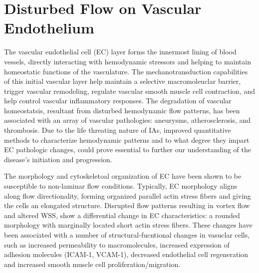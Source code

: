\section{Disturbed Flow on Vascular Endothelium}\label{Chapter1_Section4}

The vascular endothelial cell (EC) layer forms the innermost lining of blood vessels, directly interacting with hemodynamic stressors and helping to maintain homeostatic functions of the vasculature\cite{chien2007mechanotransduction,gimbrone2016endothelial}. The mechanotransduction capabilities of this initial vascular layer help maintain a selective macromoleuclar barrier, trigger vascular remodeling, regulate vascular smooth muscle cell contraction\cite{vanhoutte2009endothelial}, and help control vascular inflammatory responses\cite{chalouhi2012biology}. The degradation of vascular homeostatsis, resultant from disturbed hemodynamic flow patterns, has been associated with an array of vascular pathologies: aneurysms\cite{Cebral119,LONGO2017632}, atherosclerosis\cite{Liu2015}, and thrombosis\cite{chiu2011effects,uzarski2013adaptation}. Due to the life threating nature of IAs, improved quantitative methods to characterize hemodynamic patterns and to what degree they impart EC pathologic changes, could prove essential to further our understanding of the disease's initiation and progression. 

The morphology and cytoskeletoal organization of EC have been shown to be susceptible to non-laminar flow conditions\cite{wang2013endothelial}. Typically, EC morphology aligns along flow directionality, forming organized parallel actin stress fibers and giving the cells an elongated  
structure\cite{thomas2016biomimetic,gimbrone2016endothelial,balaguru2016disturbed}. Disrupted flow patterns resulting in vortex flow and altered WSS, show a differential change in EC characteristics: a rounded morphology with marginally located short actin stress fibers\cite{chiu2011effects,uzarski2013adaptation,dolan2011high}. These changes have been associated with a number of structural-fucntional changes in vasuclar cells, such as increased permeability to macromolecules, increased expression of adhesion molecules (ICAM-1, VCAM-1), decreased endothelial cell regeneration and increased smooth muscle cell proliferation/migration.


